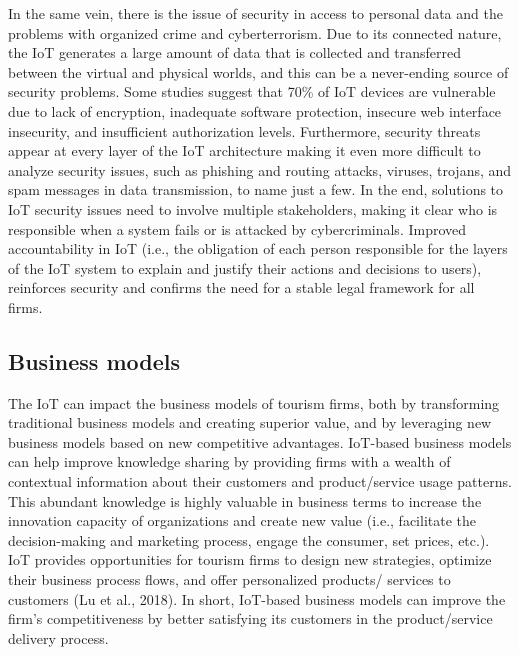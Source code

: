 \documentclass[
  letterpaper,
  DIV=11,
  numbers=noendperiod]{scrreprt}
\begin{document}
In the same vein, there is the issue of security in access to personal
data and the problems with organized crime and cyberterrorism. Due to
its connected nature, the IoT generates a large amount of data that is
collected and transferred between the virtual and physical worlds, and
this can be a never-ending source of security problems. Some studies
suggest that 70\% of IoT devices are vulnerable due to lack of
encryption, inadequate software protection, insecure web interface
insecurity, and insufficient authorization levels. Furthermore, security
threats appear at every layer of the IoT architecture making it even
more difficult to analyze security issues, such as phishing and routing
attacks, viruses, trojans, and spam messages in data transmission, to
name just a few. In the end, solutions to IoT security issues need to
involve multiple stakeholders, making it clear who is responsible when a
system fails or is attacked by cybercriminals. Improved accountability
in IoT (i.e., the obligation of each person responsible for the layers
of the IoT system to explain and justify their actions and decisions to
users), reinforces security and confirms the need for a stable legal
framework for all firms.

\hypertarget{business-models}{%
\subsection{Business models}\label{business-models}}

The IoT can impact the business models of tourism firms, both by
transforming traditional business models and creating superior value,
and by leveraging new business models based on new competitive
advantages. IoT-based business models can help improve knowledge sharing
by providing firms with a wealth of contextual information about their
customers and product/service usage patterns. This abundant knowledge is
highly valuable in business terms to increase the innovation capacity of
organizations and create new value (i.e., facilitate the decision-making
and marketing process, engage the consumer, set prices, etc.). IoT
provides opportunities for tourism firms to design new strategies,
optimize their business process flows, and offer personalized products/
services to customers (Lu et al., 2018). In short, IoT-based business
models can improve the firm's competitiveness by better satisfying its
customers in the product/service delivery process.
\end{document}
